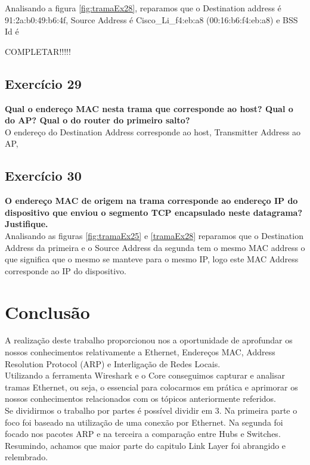 \documentclass[a4paper]{report}
\begin{document}
Analisando a figura \ref{fig:tramaEx28}, reparamos que o Destination address é
91:2a:b0:49:b6:4f, Source Address é Cisco_Li_f4:eb:a8 
(00:16:b6:f4:eb:a8) e BSS Id é 

COMPLETAR!!!!!

\section{Exercício 29}
\textbf{Qual o endereço MAC nesta trama que corresponde ao host? Qual o do AP?
    Qual o do router do primeiro salto?}\\

O endereço do Destination Address corresponde ao host, Transmitter Address ao AP, 


\section{Exercício 30}
\textbf{O endereço MAC de origem na trama corresponde ao endereço IP do
    dispositivo que enviou o segmento TCP encapsulado neste datagrama?
    Justifique.}\\

Analisando as figuras \ref{fig:tramaEx25} e \ref{tramaEx28} reparamos que o
Destination Address da primeira e o Source Address da segunda tem o mesmo MAC 
address o que significa que o mesmo se manteve para o mesmo IP, logo 
este MAC Address corresponde ao IP do dispositivo.



\chapter{Conclusão}
A realização deste trabalho proporcionou nos a oportunidade de aprofundar os
nossos conhecimentos relativamente a Ethernet, Endereços MAC, Address Resolution
Protocol (ARP) e Interligação de Redes Locais.\\
Utilizando a ferramenta Wireshark e o Core conseguimos capturar e analisar
tramas Ethernet, ou seja, o essencial para colocarmos em prática e aprimorar os
nossos conhecimentos relacionados com os tópicos anteriormente referidos.\\
Se dividirmos o trabalho por partes é possível dividir em 3. Na primeira parte o
foco foi baseado na utilização de uma conexão por Ethernet. Na segunda foi
focado nos pacotes ARP e na terceira a comparação entre Hubs e Switches.
Resumindo, achamos que maior parte do capitulo Link Layer foi abrangido e
relembrado.
\end{document}
